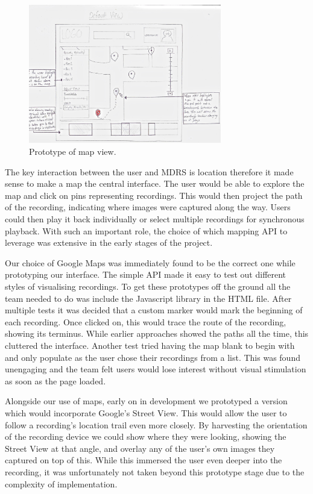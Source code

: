 \documentclass{l3proj}
\begin{document}
\begin{figure}[ht!]
\centering
\includegraphics[width=0.75\textwidth]{images/web-map-view.jpg}
\caption{Prototype of map view.}
\end{figure}

The key interaction between the user and MDRS is location therefore it made sense to make a map the central interface. The user would be able to explore the map and click on pins representing recordings. This would then project the path of the recording, indicating where images were captured along the way. Users could then play it back individually or select multiple recordings for synchronous playback. With such an important role, the choice of which mapping API to leverage was extensive in the early stages of the project.

Our choice of Google Maps was immediately found to be the correct one while prototyping our interface. The simple API made it easy to test out different styles of visualising recordings. To get these prototypes off the ground all the team needed to do was include the Javascript library in the HTML file. After multiple tests it was decided that a custom marker would mark the beginning of each recording. Once clicked on, this would trace the route of the recording, showing its terminus. While earlier approaches showed the paths all the time, this cluttered the interface. Another test tried having the map blank to begin with and only populate as the user chose their recordings from a list. This was found unengaging and the team felt users would lose interest without visual stimulation as soon as the page loaded.

Alongside our use of maps, early on in development we prototyped a version which would incorporate Google's Street View. This would allow the user to follow a recording's location trail even more closely. By harvesting the orientation of the recording device we could show where they were looking, showing the Street View at that angle, and overlay any of the user's own images they captured on top of this. While this immersed the user even deeper into the recording, it was unfortunately not taken beyond this prototype stage due to the complexity of implementation.
\end{document}
